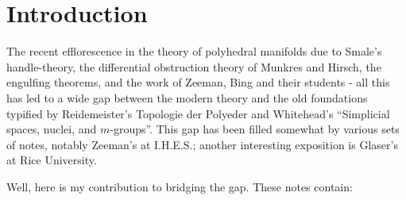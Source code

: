 \chapter*{Introduction}\pageoriginale



The recent efflorescence in the theory of polyhedral manifolds due to Smale's handle-theory, the differential obstruction theory of Munkres and Hirsch, the engulfing theorems, and the work of Zeeman, Bing and their students - all this has led to a wide gap between the modern theory and the old foundations typified by Reidemeister's {\rm Topologie der Polyeder} and Whitehead's ``Simplicial spaces, nuclei, and $m$-groups''. This gap has been filled somewhat by various sets of notes, notably Zeeman's at I.H.E.S.; another interesting exposition is Glaser's at Rice University. 

Well, here is my contribution to bridging the gap. These notes contain:

